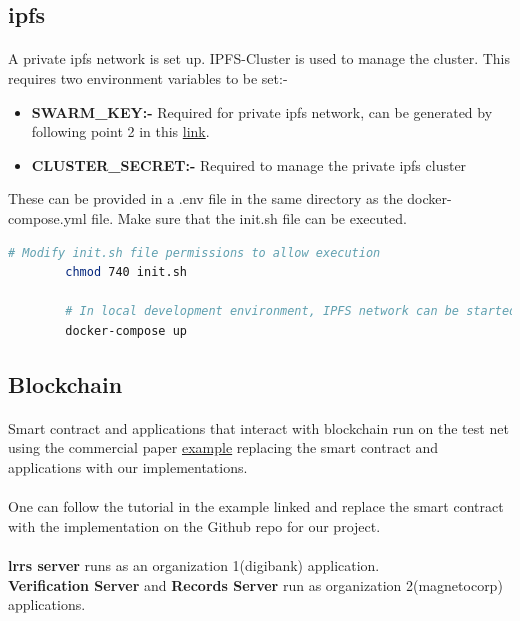\documentclass[12pt]{article}
\begin{document}
    \subsection{\acrshort{ipfs}}
        \paragraph{}
        A private \acrshort{ipfs} network is set up. IPFS-Cluster is used to manage the cluster. This requires two environment variables to be set:-
        \begin{itemize}
            \item \textbf{SWARM\_KEY:-} Required for private \acrshort{ipfs} network, can be generated by following point 2 in this \href{https://github.com/ahester57/ipfs-private-swarm}{link}.
            \item \textbf{CLUSTER\_SECRET:-} Required to manage the private \acrshort{ipfs} cluster
        \end{itemize}
    
        These can be provided in a .env file in the same directory as the docker-compose.yml file.
        Make sure that the init.sh file can be executed.
    
        \begin{lstlisting}[language=bash, caption=IPFS]
        # Modify init.sh file permissions to allow execution
        chmod 740 init.sh
        
        # In local development environment, IPFS network can be started by using the command:-
        docker-compose up
        \end{lstlisting}
    
        \subsection{Blockchain}
    
        \paragraph{}
        Smart contract and applications that interact with blockchain run on the test net using the commercial paper \href{https://hyperledger-fabric.readthedocs.io/en/latest/tutorial/commercial_paper.html}{example} replacing the smart contract and applications with our implementations.
        
        \paragraph{}
        One can follow the tutorial in the example linked and replace the smart contract with the implementation on the Github repo for our project.\\
        \\
        \textbf{\acrshort{lrrs} server} runs as an organization 1(digibank) application.\\
        \textbf{Verification Server} and \textbf{Records Server} run as organization 2(magnetocorp) applications.
    
\end{document}
